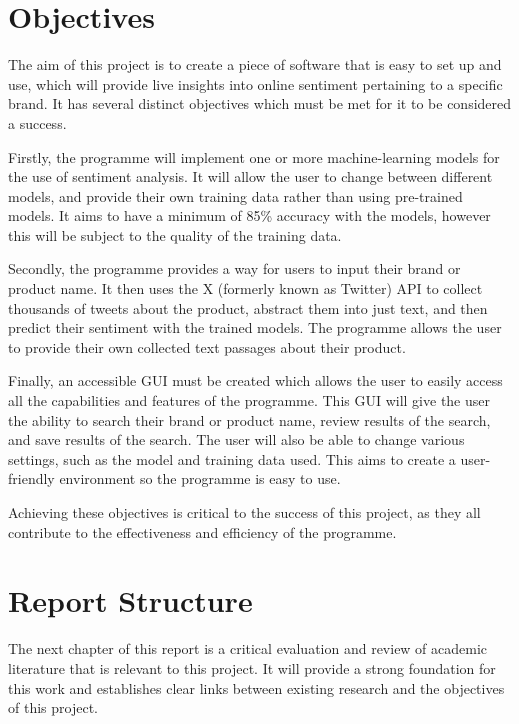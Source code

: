 \section{Objectives}
The aim of this project is to create a piece of software that is easy to set up and use, which will provide live insights into online sentiment pertaining to a specific brand. It has several distinct objectives which must be met for it to be considered a success.

Firstly, the programme will implement one or more machine-learning models for the use of sentiment analysis. It will allow the user to change between different models, and provide their own training data rather than using pre-trained models. It aims to have a minimum of 85\% accuracy with the models, however this will be subject to the quality of the training data.

Secondly, the programme provides a way for users to input their brand or product name. It then uses the X (formerly known as Twitter) API to collect thousands of tweets about the product, abstract them into just text, and then predict their sentiment with the trained models. The programme allows the user to provide their own collected text passages about their product.

Finally, an accessible GUI must be created which allows the user to easily access all the capabilities and features of the programme. This GUI will give the user the ability to search their brand or product name, review results of the search, and save results of the search. The user will also be able to change various settings, such as the model and training data used. This aims to create a user-friendly environment so the programme is easy to use.

Achieving these objectives is critical to the success of this project, as they all contribute to the effectiveness and efficiency of the programme.

\section{Report Structure}
The next chapter of this report is a critical evaluation and review of academic literature that is relevant to this project. It will provide a strong foundation for this work and establishes clear links between existing research and the objectives of this project.

